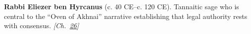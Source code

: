 \textbf{Rabbi Eliezer ben Hyrcanus} (c. 40 CE–c. 120 CE). Tannaitic sage who is central to the ``Oven of Akhnai'' narrative establishing that legal authority rests with consensus. \emph{[Ch.~\hyperref[ch:jewishcalendar]{26}]}

